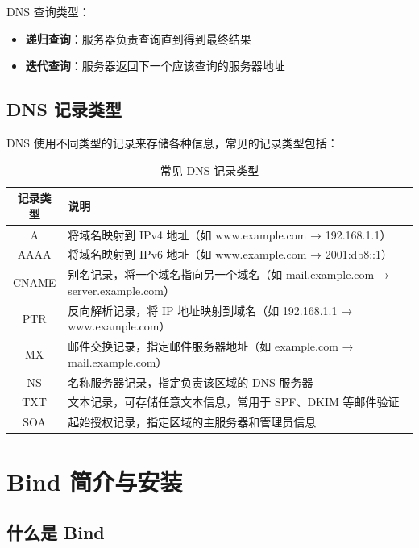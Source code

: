 \documentclass[12pt,UTF8]{ctexbook}
\begin{document}
DNS 查询类型：
\begin{itemize}
    \item \textbf{递归查询}：服务器负责查询直到得到最终结果
    \item \textbf{迭代查询}：服务器返回下一个应该查询的服务器地址
\end{itemize}

\section{DNS 记录类型}
\label{sec:dns_record_types}

DNS 使用不同类型的记录来存储各种信息，常见的记录类型包括：

\begin{table}[htbp]
    \centering
    \caption{常见 DNS 记录类型}
    \begin{tabular}{|c|p{8cm}|}
        \hline
        \textbf{记录类型} & \textbf{说明} \\
        \hline
        A & 将域名映射到 IPv4 地址（如 www.example.com → 192.168.1.1） \\
        \hline
        AAAA & 将域名映射到 IPv6 地址（如 www.example.com → 2001:db8::1） \\
        \hline
        CNAME & 别名记录，将一个域名指向另一个域名（如 mail.example.com → server.example.com） \\
        \hline
        PTR & 反向解析记录，将 IP 地址映射到域名（如 192.168.1.1 → www.example.com） \\
        \hline
        MX & 邮件交换记录，指定邮件服务器地址（如 example.com → mail.example.com） \\
        \hline
        NS & 名称服务器记录，指定负责该区域的 DNS 服务器 \\
        \hline
        TXT & 文本记录，可存储任意文本信息，常用于 SPF、DKIM 等邮件验证 \\
        \hline
        SOA & 起始授权记录，指定区域的主服务器和管理员信息 \\
        \hline
    \end{tabular}
\end{table}

\chapter{Bind 简介与安装}
\label{chap:bind_intro_install}

\section{什么是 Bind}
\label{sec:what_is_bind}
\end{document}
